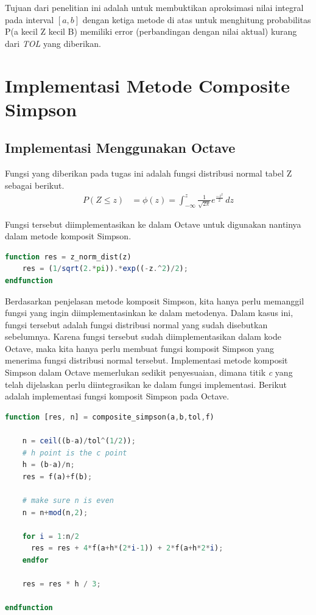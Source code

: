 \documentclass[journal,12pt,onecolumn,a4paper]{IEEEtran}
\begin{document}
Tujuan dari penelitian ini adalah untuk membuktikan aproksimasi nilai integral pada interval \([a, b]\) dengan ketiga metode di atas untuk menghitung probabilitas P(a kecil Z kecil B) memiliki error (perbandingan dengan nilai aktual) kurang dari \emph{TOL} yang diberikan.

\section{Implementasi Metode Composite Simpson}

\subsection{Implementasi Menggunakan Octave}

\par Fungsi yang diberikan pada tugas ini adalah fungsi distribusi normal tabel Z sebagai berikut.
\begin{equation*}
	\begin{split}
		P(Z \le z ) & = \phi(z) = \int_{-\infty}^{z} \frac{1}{\sqrt{2\pi}}e ^{\frac{-z^2}{2}} \,dz
	\end{split}
\end{equation*}

Fungsi tersebut diimplementasikan ke dalam Octave untuk digunakan nantinya dalam metode komposit Simpson.

\begin{center}
	\begin{lstlisting}[language=Octave]
function res = z_norm_dist(z)
	res = (1/sqrt(2.*pi)).*exp((-z.^2)/2);
endfunction
	\end{lstlisting}
\end{center}

Berdasarkan penjelasan metode komposit Simpson, kita hanya perlu memanggil fungsi yang ingin diimplementasinkan ke dalam metodenya. Dalam kasus ini, fungsi tersebut adalah fungsi distribusi normal yang sudah disebutkan sebelumnya. Karena fungsi tersebut sudah diimplementasikan dalam kode Octave, maka kita hanya perlu membuat fungsi komposit Simpson yang menerima fungsi distribusi normal tersebut. Implementasi metode komposit Simpson dalam Octave memerlukan sedikit penyesuaian, dimana titik \emph{c} yang telah dijelaskan perlu diintegrasikan ke dalam fungsi implementasi. Berikut adalah implementasi fungsi komposit Simpson pada Octave.

\begin{center}
	\begin{lstlisting}[language=Octave]
function [res, n] = composite_simpson(a,b,tol,f)

	n = ceil((b-a)/tol^(1/2));
	# h point is the c point
	h = (b-a)/n;
	res = f(a)+f(b);
	 
	# make sure n is even
	n = n+mod(n,2);
	 
	for i = 1:n/2
	  res = res + 4*f(a+h*(2*i-1)) + 2*f(a+h*2*i);
	endfor
	 
	res = res * h / 3;
	 
endfunction
	\end{lstlisting}
\end{center}
\end{document}
